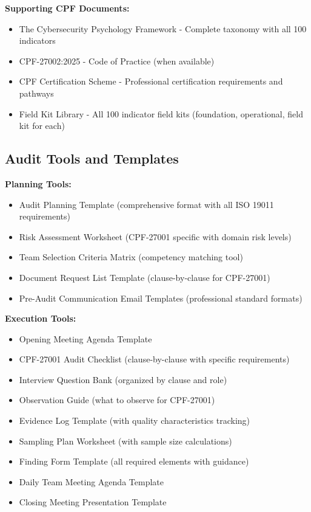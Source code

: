 \documentclass[11pt,a4paper]{article}
\begin{document}
\textbf{Supporting CPF Documents:}
\begin{itemize}
\item The Cybersecurity Psychology Framework - Complete taxonomy with all 100 indicators
\item CPF-27002:2025 - Code of Practice (when available)
\item CPF Certification Scheme - Professional certification requirements and pathways
\item Field Kit Library - All 100 indicator field kits (foundation, operational, field kit for each)
\end{itemize}

\subsection{Audit Tools and Templates}

\textbf{Planning Tools:}
\begin{itemize}
\item Audit Planning Template (comprehensive format with all ISO 19011 requirements)
\item Risk Assessment Worksheet (CPF-27001 specific with domain risk levels)
\item Team Selection Criteria Matrix (competency matching tool)
\item Document Request List Template (clause-by-clause for CPF-27001)
\item Pre-Audit Communication Email Templates (professional standard formats)
\end{itemize}

\textbf{Execution Tools:}
\begin{itemize}
\item Opening Meeting Agenda Template
\item CPF-27001 Audit Checklist (clause-by-clause with specific requirements)
\item Interview Question Bank (organized by clause and role)
\item Observation Guide (what to observe for CPF-27001)
\item Evidence Log Template (with quality characteristics tracking)
\item Sampling Plan Worksheet (with sample size calculations)
\item Finding Form Template (all required elements with guidance)
\item Daily Team Meeting Agenda Template
\item Closing Meeting Presentation Template
\end{itemize}
\end{document}
